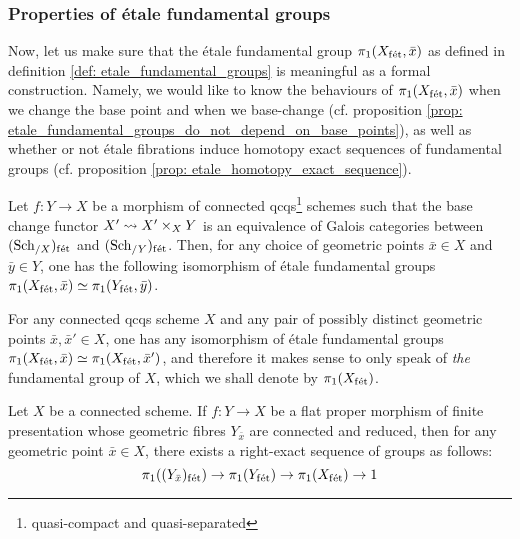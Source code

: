         \subsubsection{Properties of \'etale fundamental groups}
            Now, let us make sure that the \'etale fundamental group $\pi_1(X_{\mathrm{f\acute{e}t}}, \bar{x})$ as defined in definition \ref{def: etale_fundamental_groups} is meaningful as a formal construction. Namely, we would like to know the behaviours of $\pi_1(X_{\mathrm{f\acute{e}t}}, \bar{x})$ when we change the base point and when we base-change (cf. proposition \ref{prop: etale_fundamental_groups_do_not_depend_on_base_points}), as well as whether or not \'etale fibrations induce homotopy exact sequences of fundamental groups (cf. proposition \ref{prop: etale_homotopy_exact_sequence}). 
            \begin{proposition} \label{prop: etale_fundamental_groups_do_not_depend_on_base_points}
                \cite[\href{https://stacks.math.columbia.edu/tag/0BQA}{Tag 0BQA}]{stacks} Let $f: Y \to X$ be a morphism of connected qcqs\footnote{quasi-compact and quasi-separated} schemes such that the base change functor $X' \mapsto X' \x_X Y$ is an equivalence of Galois categories between $(\mathrm{Sch}_{/X})_{\mathrm{f\acute{e}t}}$ and $(\mathrm{Sch}_{/Y})_{\mathrm{f\acute{e}t}}$. Then, for any choice of geometric points $\bar{x} \in X$ and $\bar{y} \in Y$, one has the following isomorphism of \'etale fundamental groups $\pi_1(X_{\mathrm{f\acute{e}t}}, \bar{x}) \simeq \pi_1(Y_{\mathrm{f\acute{e}t}}, \bar{y})$.
            \end{proposition}
            \begin{corollary} \label{coro: etale_fundamental_group_uniqueness}
                For any connected qcqs scheme $X$ and any pair of possibly distinct geometric points $\bar{x}, \bar{x}' \in X$, one has any isomorphism of \'etale fundamental groups $\pi_1(X_{\mathrm{f\acute{e}t}}, \bar{x}) \simeq \pi_1(X_{\mathrm{f\acute{e}t}}, \bar{x}')$, and therefore it makes sense to only speak of \textit{the} fundamental group of $X$, which we shall denote by $\pi_1(X_{\mathrm{f\acute{e}t}})$.
            \end{corollary}
            
            \begin{proposition} \label{prop: etale_homotopy_exact_sequence}
                \cite[\href{https://stacks.math.columbia.edu/tag/0C0J}{Tag 0C0J}]{stacks} Let $X$ be a connected scheme. If $f: Y \to X$ be a flat proper morphism of finite presentation whose geometric fibres $Y_{\bar{x}}$ are connected and reduced, then for any geometric point $\bar{x} \in X$, there exists a right-exact sequence of groups as follows:
                    $$\pi_1((Y_{\bar{x}})_{\mathrm{f\acute{e}t}}) \to \pi_1(Y_{\mathrm{f\acute{e}t}}) \to \pi_1(X_{\mathrm{f\acute{e}t}}) \to 1$$
            \end{proposition}
    
